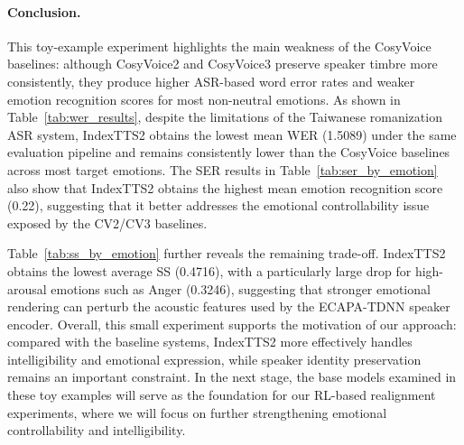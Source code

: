 \paragraph{Conclusion.} 
This toy-example experiment highlights the main weakness of the CosyVoice baselines: although CosyVoice2 and CosyVoice3 preserve speaker timbre more consistently, they produce higher ASR-based word error rates and weaker emotion recognition scores for most non-neutral emotions. As shown in Table~\ref{tab:wer_results}, despite the limitations of the Taiwanese romanization ASR system, IndexTTS2 obtains the lowest mean WER (1.5089) under the same evaluation pipeline and remains consistently lower than the CosyVoice baselines across most target emotions. The SER results in Table~\ref{tab:ser_by_emotion} also show that IndexTTS2 obtains the highest mean emotion recognition score (0.22), suggesting that it better addresses the emotional controllability issue exposed by the CV2/CV3 baselines.

Table~\ref{tab:ss_by_emotion} further reveals the remaining trade-off. IndexTTS2 obtains the lowest average SS (0.4716), with a particularly large drop for high-arousal emotions such as Anger (0.3246), suggesting that stronger emotional rendering can perturb the acoustic features used by the ECAPA-TDNN speaker encoder. Overall, this small experiment supports the motivation of our approach: compared with the baseline systems, IndexTTS2 more effectively handles intelligibility and emotional expression, while speaker identity preservation remains an important constraint. In the next stage, the base models examined in these toy examples will serve as the foundation for our RL-based realignment experiments, where we will focus on further strengthening emotional controllability and intelligibility.
